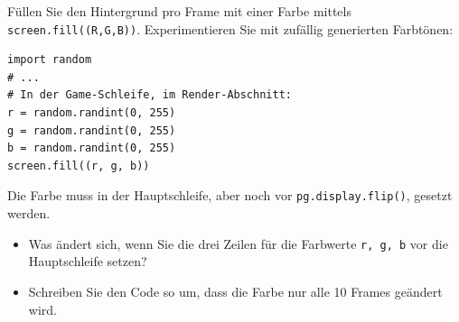\begin{myexercise}
    Füllen Sie den Hintergrund pro Frame mit einer Farbe mittels \lstinline|screen.fill((R,G,B))|. Experimentieren Sie mit zufällig generierten Farbtönen:

    \begin{lstlisting}
import random
# ...
# In der Game-Schleife, im Render-Abschnitt:
r = random.randint(0, 255)
g = random.randint(0, 255)
b = random.randint(0, 255)
screen.fill((r, g, b))
\end{lstlisting}
    Die Farbe muss in der Hauptschleife, aber noch vor \lstinline|pg.display.flip()|, gesetzt werden.

    \begin{itemize}
        \item Was ändert sich, wenn Sie die drei Zeilen für die Farbwerte \lstinline|r, g, b| vor die Hauptschleife setzen?
        \item Schreiben Sie den Code so um, dass die Farbe nur alle 10 Frames geändert wird.
    \end{itemize}


    \begin{myanswer}
        
    \end{myanswer}
\end{myexercise}

